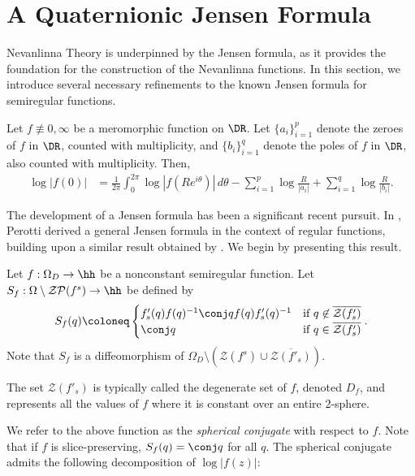 \documentclass{amsart}
\begin{document}
\section{A Quaternionic Jensen Formula}\label{PJSection}

Nevanlinna Theory is underpinned by the Jensen formula, as it provides the foundation for the construction of the Nevanlinna functions. In this section, we introduce several necessary refinements to the known Jensen formula for semiregular functions. 

\begin{teo}
Let $f\not\equiv 0, \infty$ be a meromorphic function on $\DR$. Let $\{a_i\}_{i=1}^p$ denote the zeroes of $f$ in $\DR$, counted with multiplicity, and $\{b_i\}_{i=1}^q$ denote the poles of $f$ in $\DR$, also counted with multiplicity. Then,
\begin{align*}
\log|f(0)| &= \frac{1}{2\pi} \int_0^{2\pi} \log|f(Re^{i\theta})| \, d\theta
- \sum_{i=1}^p \log \frac{R}{|a_i|} 
+ \sum_{i=1}^q \log \frac{R}{|b_i|}.
\end{align*}
\end{teo}

The development of a Jensen formula has been a significant recent pursuit. In \cite{perottiJensen2019}, Perotti derived a general Jensen formula in the context of regular functions, building upon a similar result obtained by \cite{Altavilla_2019}. We begin by presenting this result.

\begin{defin}
    Let $f:\Omega_D\to\hh$ be a nonconstant semiregular function. Let $S_f:\Omega \setminus \mathcal {ZP}(f^s) \to \hh$ be defined by \[S_f(q)\coloneq \begin{cases}
        f'_s(q)f(q)^{-1}\conj q f(q) f'_s(q)^{-1} &\text{if} ~q\not\in \overline{\mathcal {Z}(f'_s)} \\
        \conj q &\text{if} ~q\in\overline{\mathcal {Z}(f'_s)} 
    \end{cases}.\] Note that $S_f$ is a diffeomorphism of $\Omega_D\setminus(\mathcal Z (f^s) \cup \overline{\mathcal Z (f'_s)})$. 
\end{defin}
\begin{remark}
    The set $\mathcal Z (f'_s)$ is typically called the degenerate set of $f$, denoted $D_f$, and represents all the values of $f$ where it is constant over an entire 2-sphere. 
\end{remark}
We refer to the above function as the \emph{spherical conjugate} with respect to $f$. Note that if $f$ is slice-preserving, $S_f(q)=\conj q$ for all $q$. The spherical conjugate admits the following decomposition of $\log|f(z)|$: 
\end{document}
